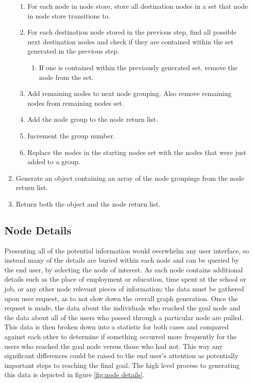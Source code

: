 \begin{enumerate}
\begin{enumerate}
     \item For each node in node store, store all destination nodes in a set
     that node in node store transitions to.
     \item For each destination node stored in the previous step, find all
     possible next destination nodes and check if they are contained within the
     set generated in the previous step.
     \begin{enumerate}
       \item If one is contained within the previously generated set, remove
       the node from the set.
     \end{enumerate}
     \item Add remaining nodes to next node grouping.  Also remove remaining
     nodes from remaining nodes set.
     \item Add the node group to the node return list.
     \item Increment the group number.
     \item Replace the nodes in the starting nodes set with the nodes that
     were just added to a group.
   \end{enumerate} 
   \item Generate an object containing an array of the node groupings from
   the node return list.
   \item Return both the object and the node return list.
 \end{enumerate}



\subsection{Node Details}
Presenting all of the potential information would overwhelm any user interface,
so instead many of the details are buried within each node and can be queried
by the end user, by selecting the node of interest.  As each node contains
additional details such as the place of employment or education, time spent at
the school or job, or any other node relevant pieces of information; the data
must be gathered upon user request, as to not slow down the overall graph
generation.  Once the request is made, the data about the individuals who
reached the goal node and the data about all of the users who passed through a
particular node are pulled.  This data is then broken down into a statistic for
both cases and compared against each other to determine if something occurred
more frequently for the users who reached the goal node versus those who had
not.  This way any significant differences could be raised to the end user's
attention as potentially important steps to reaching the final goal.  The high
level process to generating this data is depicted in figure \ref{fig:node
details}.

